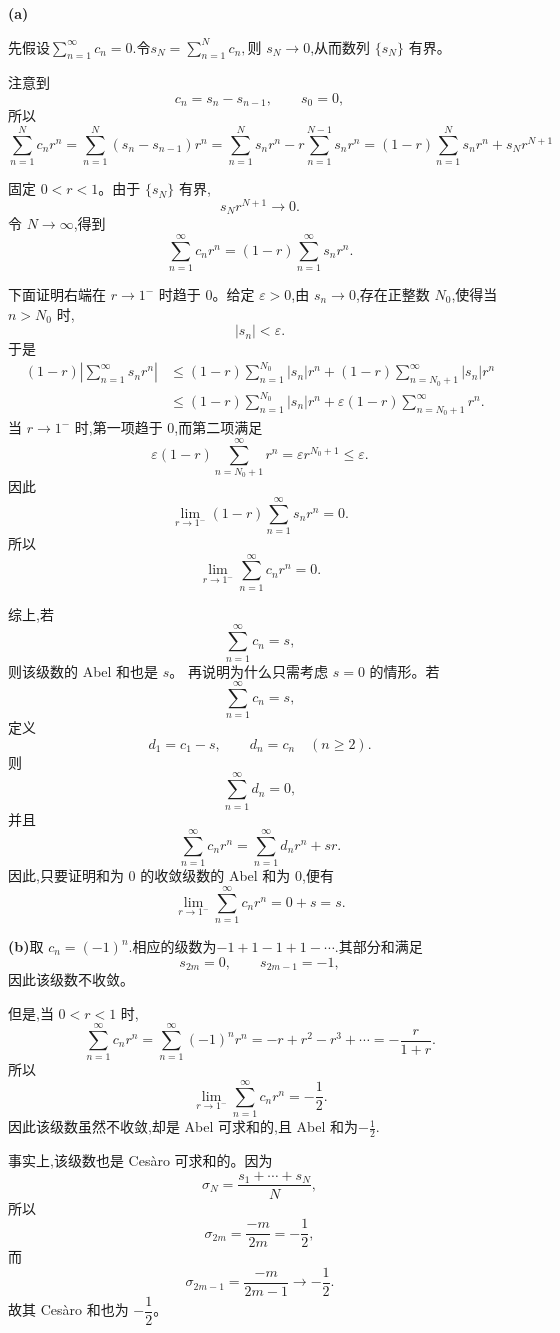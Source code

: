 \begin{solution}
	\textbf{(a)}
	
	
	先假设$ \sum\limits_{n=1}^{\infty}c_n=0.$令$s_N=\sum\limits_{n=1}^{N}c_n,$则 $s_N\to0$,从而数列 $\{s_N\}$ 有界。
	
	注意到
	\[
	c_n=s_n-s_{n-1},
	\qquad s_0=0,
	\]
	所以
	\[\sum_{n=1}^{N}c_nr^n
	=\sum_{n=1}^{N}(s_n-s_{n-1})r^n
	=\sum_{n=1}^{N}s_nr^n
	-r\sum_{n=1}^{N-1}s_nr^n
	=(1-r)\sum_{n=1}^{N}s_nr^n+s_Nr^{N+1}
	\]
	
	固定 $0<r<1$。由于 $\{s_N\}$ 有界,
	\[
	s_Nr^{N+1}\to0.
	\]
	令 $N\to\infty$,得到
	\[
	\sum_{n=1}^{\infty}c_nr^n
	=(1-r)\sum_{n=1}^{\infty}s_nr^n.
	\]
	
	下面证明右端在 $r\to1^-$ 时趋于 $0$。给定 $\varepsilon>0$,由 $s_n\to0$,存在正整数 $N_0$,使得当 $n>N_0$ 时,
	\[
	|s_n|<\varepsilon.
	\]
	于是
	\[
	\begin{aligned}
		(1-r)\left|\sum_{n=1}^{\infty}s_nr^n\right|
		&\leq
		(1-r)\sum_{n=1}^{N_0}|s_n|r^n
		+(1-r)\sum_{n=N_0+1}^{\infty}|s_n|r^n\\
		&\leq
		(1-r)\sum_{n=1}^{N_0}|s_n|r^n
		+\varepsilon(1-r)\sum_{n=N_0+1}^{\infty}r^n.
	\end{aligned}
	\]
	当 $r\to1^-$ 时,第一项趋于 $0$,而第二项满足
	\[
	\varepsilon(1-r)\sum_{n=N_0+1}^{\infty}r^n
	=\varepsilon r^{N_0+1}
	\leq\varepsilon.
	\]
	因此
	\[
	\lim_{r\to1^-}(1-r)\sum_{n=1}^{\infty}s_nr^n=0.
	\]
	所以
	\[
	\lim_{r\to1^-}\sum_{n=1}^{\infty}c_nr^n=0.
	\]
	
	综上,若
	\[
	\sum_{n=1}^{\infty}c_n=s,
	\]
	则该级数的 Abel 和也是 $s$。
	再说明为什么只需考虑 $s=0$ 的情形。若
	\[
	\sum_{n=1}^{\infty}c_n=s,
	\]
	定义
	\[
	d_1=c_1-s,\qquad d_n=c_n\quad(n\geq2).
	\]
	则
	\[
	\sum_{n=1}^{\infty}d_n=0,
	\]
	并且
	\[
	\sum_{n=1}^{\infty}c_nr^n
	=\sum_{n=1}^{\infty}d_nr^n+sr.
	\]
	因此,只要证明和为 $0$ 的收敛级数的 Abel 和为 $0$,便有
	\[
	\lim_{r\to1^-}\sum_{n=1}^{\infty}c_nr^n
	=0+s=s.
	\]
	
	\textbf{(b)}取	$c_n=(-1)^n.$相应的级数为$-1+1-1+1-\cdots.$其部分和满足
	\[
	s_{2m}=0,\qquad s_{2m-1}=-1,
	\]
	因此该级数不收敛。
	
	但是,当 $0<r<1$ 时,
	\[	\sum_{n=1}^{\infty}c_nr^n
	=\sum_{n=1}^{\infty}(-1)^nr^n
	=-r+r^2-r^3+\cdots
	=-\frac{r}{1+r}.
	\]
	所以
	\[
	\lim_{r\to1^-}\sum_{n=1}^{\infty}c_nr^n
	=-\frac12.
	\]
	因此该级数虽然不收敛,却是 Abel 可求和的,且 Abel 和为$-\frac12.$
	
	事实上,该级数也是 Ces\`aro 可求和的。因为
	\[
	\sigma_N=\frac{s_1+\cdots+s_N}{N},
	\]
	所以
	\[
	\sigma_{2m}
	=\frac{-m}{2m}
	=-\frac12,
	\]
	而
	\[
	\sigma_{2m-1}
	=\frac{-m}{2m-1}
	\to-\frac12.
	\]
	故其 Ces\`aro 和也为 $-\dfrac12$。
	

\end{solution}
